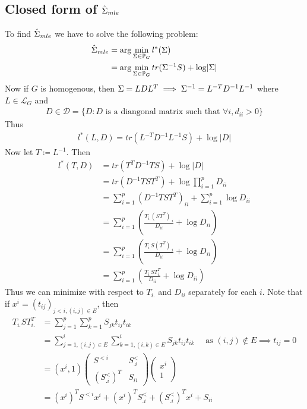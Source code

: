 \documentclass[12pt, leqno]{article}
\providecommand{\abs}[1]{\lvert#1\rvert}
\let\oldhat\hat
\renewcommand{\hat}[1]{\oldhat{{#1}}}
\def\s{\ensuremath\Sigma}
\def\pg{\ensuremath\mathbb{P}_{{G}}}
\begin{document}
\subsection{Closed form of $\hat{\s}_{mle}$}
To find $\hat{\s}_{mle}$ we have to solve the following problem:
\begin{align*}
\hat{\s}_{mle} &= \arg \min_{\s \in \pg} l^*(\s) \\
 &= \arg \min_{\s \in \pg} tr(\s^{-1}S) + \log \abs{\s}
\end{align*}
Now if $G$ is homogenous, then $\s = LDL^T \implies \s^{-1} = L^{-T}D^{-1}L^{-1} $ where $L \in
\mathcal{L}_G$ and 
\begin{align*}
D \in \mathcal{D} = \{D: D \text{ is a diangonal matrix such that }
  \forall i,d_{ii}>0\}
\end{align*}
Thus 
\begin{align*}
l^*(L,D) = tr(L^{-T}D^{-1}L^{-1}S) + \log \abs{D}
\end{align*}
Now let $T \coloneqq L^{-1}$.
Then
\begin{align*}
l^*(T,D) &= tr(T^{T}D^{-1}TS) + \log \abs{D} \\ 
&= tr(D^{-1}TST^{T}) + \log \prod_{i=1}^p D_{ii} \\ 
&= \sum_{i=1}^p(D^{-1}TST^{T})_{ii} + \sum_{i=1}^p \log D_{ii} \\ 
&= \sum_{i=1}^p (\frac{T_{i.}(ST^{T})_{.i} }{D_{ii}}+ \log
  D_{ii})\\
&= \sum_{i=1}^p (\frac{T_{i.}S(T^{T})_{.i} }{D_{ii}}+ \log
  D_{ii}) \\
&= \sum_{i=1}^p (\frac{T_{i.}S T_{i.}^T}{D_{ii}}+ \log
  D_{ii}) 
\end{align*}
Thus we can minimize with respect to $T_{i.}$ and $D_{ii}$ separately
for each $i$. Note that if $x^i = (t_{ij})_{j<i,(i,j) \in E}$, then 
\begin{align*}
T_{i.}ST_{i.}^T 
&= \sum_{j=1}^p \sum_{k=1}^p S_{jk}t_{ij}t_{ik}\\
&= \sum_{j=1,(i,j) \in E}^i \sum_{k=1,(i,k) \in E}^i
  S_{jk}t_{ij}t_{ik} \quad \text { as } (i,j) \not\in E \implies t_{ij}=0\\
&= (x^i,1)
\begin{pmatrix} 
S^{<i} & S^{<}_{.i} \\
(S^{<}_{.i})^T& S_{ii} 
\end{pmatrix}
\begin{pmatrix} 
x^i\\1
\end{pmatrix}\\
&= (x^i)^T S^{<i} x^i + (x^i)^T S^{<}_{.i} + (S^{<}_{.i})^T x^i + S_{ii}
\end{align*}
\end{document}
